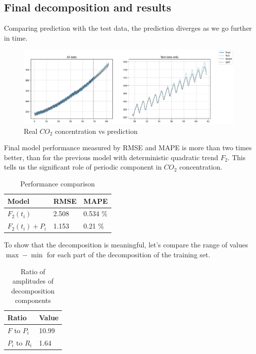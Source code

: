 \documentclass[12pt,a4paper]{article}
\begin{document}
\subsection{Final decomposition and results}

Comparing prediction with the test data, the prediction diverges as we go further in time.

\begin{figure}[h!]
	\centering
	\includegraphics[width=\textwidth]{figures/co2_prediction.png}
	\caption{Real $CO_2$ concentration vs prediction}
\end{figure}

Final model performance measured by RMSE and MAPE is more than two times better, than for the previous model with deterministic quadratic trend $F_2$. This tells us the significant role of periodic component in $CO_2$ concentration.

\begin{table}[h!]
	\begin{tabular}{|l|l|l|}
		\hline
		Model				& RMSE & MAPE \\ \hline
		$F_2 (t_i)$ 		& 2.508 & 0.534 \% \\ \hline
		$F_2 (t_i) + P_i$ 	& 1.153 &  0.21 \% \\ \hline
	\end{tabular}
	\centering
	\caption{Performance comparison}
\end{table}

To show that the decomposition is meaningful, let's compare the range of values $\max - \min$ for each part of the decomposition of the training set.

\begin{table}[h!]
\begin{tabular}{|l|l|}
	\hline
	Ratio 			& Value \\ \hline
	$F$ to $P_i$ 	& 10.99 \\ \hline
	$P_i$ to $R_i$  & 1.64 \\ \hline 
\end{tabular}
\centering
\caption{Ratio of amplitudes of decomposition components}
\end{table} 
\end{document}
